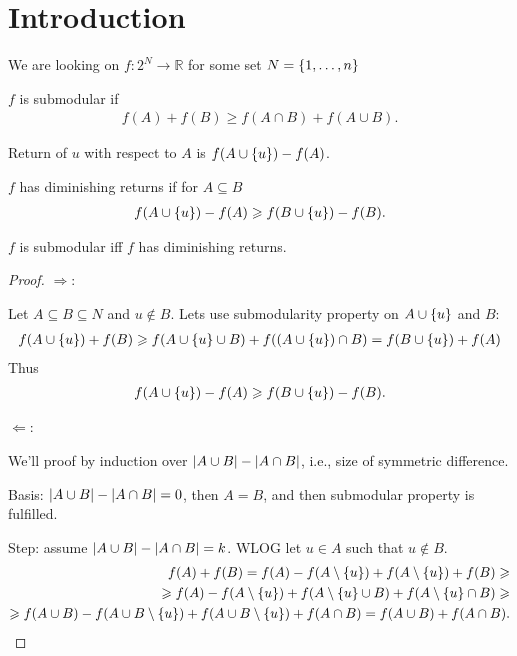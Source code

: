 \section{Introduction}
We are looking on $f: 2^N \to \mathbb{R}$ for some set $N = \qty{1, \dots, n }$
\begin{definition}
	$f$ is submodular if 
	\begin{align}
	f(A)+f(B) \geqslant f(A\cap B) + f(A\cup B).
	\end{align}
\end{definition}

\begin{definition}
	Return of $u$ with respect to $A$ is $f(A \cup \qty{u }) - f(A)$.
\end{definition}
\begin{definition}
$f$ has diminishing returns if for $A\subseteq B$
\begin{align}
f(A \cup \qty{u }) - f(A) \geqslant f(B \cup \qty{u }) - f(B).
\end{align}
\end{definition}

\begin{prop}
	$f$ is submodular iff $f$ has diminishing returns.
	\begin{proof}
		$\Rightarrow$:
		
		Let $A\subseteq B \subseteq N$ and $u\notin B$. Lets use submodularity property on $A\cup \qty{ u }$ and $B$:
		\begin{align}
		f(A\cup \qty{ u }) + f(B) \geqslant f\qty(A\cup \qty{ u } \cup B) + f\qty((A\cup \qty{ u }) \cap B)  = f\qty(B\cup \qty{ u }) + f(A)  
		\end{align}
		Thus
		\begin{align}
		f(A\cup \qty{ u })-f(A) \geqslant f\qty(B\cup \qty{ u })-f(B).
		\end{align}


	$\Leftarrow$:
	
	We'll proof by induction over $\abs{A\cup B} - \abs{A\cap B}$, i.e., size of symmetric difference.
	
	Basis: $\abs{A\cup B} - \abs{A\cap B} = 0$, then $A=B$, and then submodular property is fulfilled.
	
	Step: assume $\abs{A\cup B} - \abs{A\cap B} = k$. WLOG let $u\in A$ such that $u\notin B$.
	\begin{align}
	f(A) + f(B) = f(A) - f(A \setminus \qty{u}) + f(A \setminus  \qty{u}) + f(B) \geqslant\\\geqslant  f(A) - f(A \setminus \qty{u}) + f(A \setminus  \qty{u} \cup B) + f(A \setminus  \qty{u}  \cap B) \geqslant\\\geqslant f(A\cup B) -  f(A\cup B \setminus \qty{ u }) + f(A  \cup B \setminus  \qty{u} ) + f(A  \cap B) = f(A\cup B) + f(A\cap B).
	\end{align}

\end{proof}
\end{prop}

